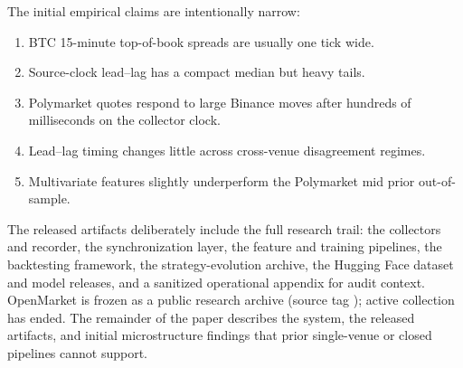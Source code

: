The initial empirical claims are intentionally narrow:
\begin{enumerate}
  \item BTC 15-minute top-of-book spreads are usually one tick wide.
  \item Source-clock lead--lag has a compact median but heavy tails.
  \item Polymarket quotes respond to large Binance moves after hundreds of
        milliseconds on the collector clock.
  \item Lead--lag timing changes little across cross-venue disagreement regimes.
  \item Multivariate features slightly underperform the Polymarket mid prior
        out-of-sample.
\end{enumerate}

The released artifacts deliberately include the full research trail: the
collectors and recorder, the synchronization layer, the feature and
training pipelines, the backtesting framework, the strategy-evolution archive,
the Hugging Face dataset and model releases, and a sanitized operational
appendix for audit context. OpenMarket is frozen as a public research archive
(source tag \OpenMarketReleaseTag{}); active collection has ended. The remainder of the
paper describes the system, the released artifacts, and initial microstructure
findings that prior single-venue or closed pipelines cannot support.

